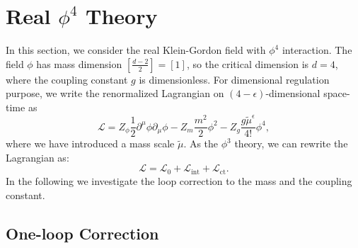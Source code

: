 \section{Real $\phi^4$ Theory}
In this section, we consider the real Klein-Gordon field with $\phi^4$ interaction.
The field $\phi$ has mass dimension $[\frac{d-2}{2}]=[1]$, so the critical dimension is $d=4$, where the coupling constant $g$ is dimensionless.
For dimensional regulation purpose, we write the renormalized Lagrangian on $(4-\epsilon)$-dimensional space-time as
\begin{equation}
	\mathcal{L}
	= Z_{\phi}\frac{1}{2} \partial^\mu\phi\partial_\mu\phi - 
	Z_m \frac{m^2}{2}\phi^2 - Z_g\frac{g \tilde{\mu}^\epsilon}{4!}\phi^4,
\end{equation}
where we have introduced a mass scale $\tilde \mu$.
As the $\phi^3$ theory, we can rewrite the Lagrangian as:
\begin{equation}
	\mathcal L = \mathcal L_0 + \mathcal L_{\mathrm{int}} + \mathcal L_{\mathrm{ct}}.
\end{equation}
In the following we investigate the loop correction to the mass and the coupling constant.


\subsection{One-loop Correction}
